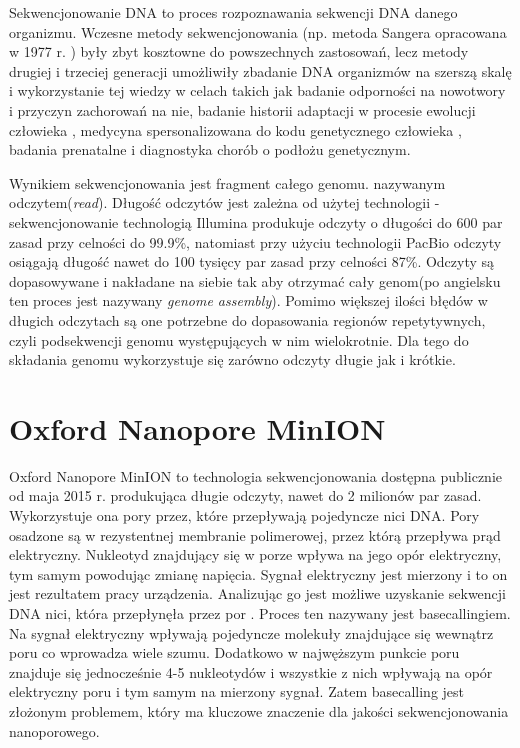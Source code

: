 \documentclass[a4paper,11pt,twoside]{report}
\theoremstyle{definition}
\begin{document}
Sekwencjonowanie DNA to proces rozpoznawania sekwencji DNA danego organizmu. Wczesne metody sekwencjonowania (np. metoda Sangera opracowana w 1977 r. \cite{sequencingTechnologies}) były zbyt kosztowne do powszechnych zastosowań, lecz metody drugiej i trzeciej generacji umożliwiły zbadanie DNA organizmów na szerszą skalę i wykorzystanie tej wiedzy w celach takich jak badanie odporności na nowotwory\cite{cancerImmunity} i przyczyn zachorowań na nie\cite{cancerNonCoding}, badanie historii adaptacji w procesie ewolucji człowieka \cite{adaptation}, medycyna spersonalizowana do kodu genetycznego człowieka \cite{personalizedMedicine}, badania prenatalne \cite{prenatal} i diagnostyka chorób o podłożu genetycznym\cite{diagnosis}.

Wynikiem sekwencjonowania jest fragment całego genomu. nazywanym odczytem(\textit{read}). Długość odczytów jest zależna od użytej technologii - sekwencjonowanie technologią Illumina produkuje odczyty o długości do 600 par zasad przy celności do 99.9\%, natomiast przy użyciu technologii PacBio odczyty osiągają długość nawet do 100 tysięcy par zasad przy celności 87\%. Odczyty są dopasowywane i nakładane na siebie tak aby otrzymać cały genom(po angielsku ten proces jest nazywany \textit{genome assembly}).  Pomimo większej ilości błędów w długich odczytach są one potrzebne do dopasowania regionów repetytywnych, czyli podsekwencji genomu występujących w nim wielokrotnie. Dla tego do składania genomu wykorzystuje się zarówno odczyty długie jak i krótkie.

\section{Oxford Nanopore MinION}

Oxford Nanopore MinION to technologia sekwencjonowania dostępna publicznie od maja 2015 r. produkująca długie odczyty, nawet do 2 milionów par zasad. Wykorzystuje ona pory przez, które przepływają pojedyncze nici DNA. Pory osadzone są w rezystentnej membranie polimerowej, przez którą przepływa prąd elektryczny. Nukleotyd znajdujący się w porze wpływa na jego opór elektryczny, tym samym powodując zmianę napięcia. Sygnał elektryczny jest mierzony i to on jest rezultatem pracy urządzenia. Analizując go jest możliwe uzyskanie sekwencji DNA nici, która przepłynęła przez por \cite{nanoporeHuman}. Proces ten nazywany jest basecallingiem. Na sygnał elektryczny wpływają pojedyncze molekuły znajdujące się wewnątrz poru co wprowadza wiele szumu. Dodatkowo w najwęższym punkcie poru znajduje się jednocześnie 4-5 nukleotydów i wszystkie z nich wpływają na opór elektryczny poru i tym samym na mierzony sygnał. Zatem basecalling jest złożonym problemem, który ma kluczowe znaczenie dla jakości sekwencjonowania nanoporowego.
\end{document}

